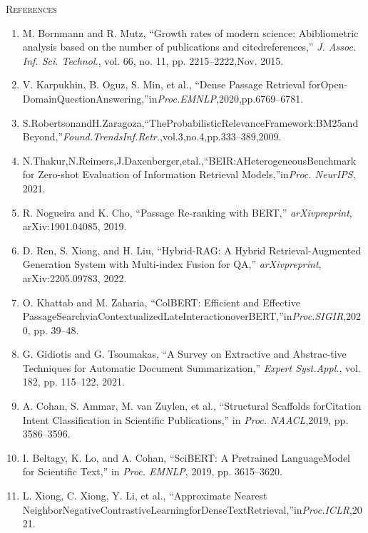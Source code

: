 \documentclass[
]{article}
\begin{document}
\textsc{References}

\begin{enumerate}
\def\labelenumi{\arabic{enumi}.}
\item
  M. Bornmann and R. Mutz, ``Growth rates of modern science: Abibliometric analysis based on the number of publications and citedreferences,'' \emph{J. Assoc. Inf. Sci. Technol.}, vol. 66, no. 11, pp. 2215--2222,\protect{}\label{_bookmark22}{}Nov. 2015.
\item
  V. Karpukhin, B. Oguz, S. Min, et al., ``Dense Passage Retrieval forOpen-DomainQuestionAnswering,''in\emph{Proc.EMNLP},2020,pp.6769--\protect{}\label{_bookmark23}{}6781.
\item
  S.RobertsonandH.Zaragoza,``TheProbabilisticRelevanceFramework:BM25andBeyond,''\emph{Found.TrendsInf.Retr.},vol.3,no.4,pp.333--389,\protect{}\label{_bookmark24}{}2009.
\item
  N.Thakur,N.Reimers,J.Daxenberger,etal.,``BEIR:AHeterogeneousBenchmark for Zero-shot Evaluation of Information Retrieval Models,''\protect{}\label{_bookmark25}{}in\emph{Proc. NeurIPS}, 2021.
\item
  R. Nogueira and K. Cho, ``Passage Re-ranking with BERT,'' \emph{arXiv}\protect{}\label{_bookmark26}{}\emph{preprint}, arXiv:1901.04085, 2019.
\item
  D. Ren, S. Xiong, and H. Liu, ``Hybrid-RAG: A Hybrid Retrieval-Augmented Generation System with Multi-index Fusion for QA,'' \emph{arXivpreprint}, arXiv:2205.09783, 2022.
\item
  O. Khattab and M. Zaharia, ``ColBERT: Efficient and Effective PassageSearchviaContextualizedLateInteractionoverBERT,''in\emph{Proc.SIGIR},\protect{}\label{_bookmark27}{}2020, pp. 39--48.
\item
  G. Gidiotis and G. Tsoumakas, ``A Survey on Extractive and Abstrac-tive Techniques for Automatic Document Summarization,'' \emph{Expert Syst.Appl.}, vol. 182, pp. 115--122, 2021.
\item
  A. Cohan, S. Ammar, M. van Zuylen, et al., ``Structural Scaffolds forCitation Intent Classification in Scientific Publications,'' in \emph{Proc. NAACL},\protect{}\label{_bookmark28}{}2019, pp. 3586--3596.
\item
  I. Beltagy, K. Lo, and A. Cohan, ``SciBERT: A Pretrained LanguageModel for Scientific Text,'' in \emph{Proc. EMNLP}, 2019, pp. 3615--3620.
\item
  L. Xiong, C. Xiong, Y. Li, et al., ``Approximate Nearest NeighborNegativeContrastiveLearningforDenseTextRetrieval,''in\emph{Proc.ICLR},\protect{}\label{_bookmark29}{}2021.

\end{enumerate}
\end{document}
